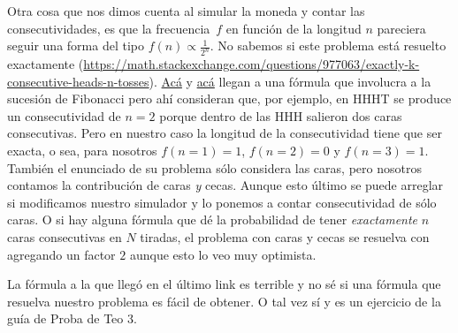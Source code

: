 \documentclass[a4paper]{article}
\begin{document}
Otra cosa que nos dimos cuenta al simular la moneda y contar las consecutividades, es que la frecuencia~$f$ en función de la longitud $n$ pareciera seguir una forma del tipo $f(n) \propto \frac{1}{2^n}$. No sabemos si este problema está resuelto exactamente (\url{https://math.stackexchange.com/questions/977063/exactly-k-consecutive-heads-n-tosses}). \href{https://math.stackexchange.com/questions/148353/given-n-raffles-what-is-the-chance-of-winning-k-in-a-row}{Acá} y \href{https://marknelson.us/posts/2011/01/17/20-heads-in-a-row-what-are-the-odds.html}{acá} llegan a una fórmula que involucra a la sucesión de Fibonacci pero ahí consideran que, por ejemplo, en HHHT se produce un consecutividad de $n=2$ porque dentro de las HHH salieron dos caras consecutivas. Pero en nuestro caso la longitud de la consecutividad tiene que ser exacta, o sea, para nosotros $f(n=1)=1$, $f(n=2)=0$ y $f(n=3)=1$. También el enunciado de su problema sólo considera las caras, pero nosotros contamos la contribución de caras \emph{y} cecas. Aunque esto último se puede arreglar si modificamos nuestro simulador y lo ponemos a contar consecutividad de sólo caras. O si hay alguna fórmula que dé la probabilidad de tener \emph{exactamente} $n$ caras consecutivas en $N$ tiradas, el problema con caras y cecas se resuelva con agregando un factor $2$ aunque esto lo veo muy optimista.

La fórmula a la que llegó en el último link es terrible y no sé si una fórmula que resuelva nuestro problema es fácil de obtener. O tal vez sí y es un ejercicio de la guía de Proba de Teo 3.
\end{document}
